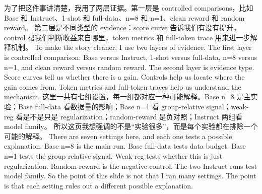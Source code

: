 {}\markdownRendererHorizontalRule{}\markdownRendererInterblockSeparator
{}\markdownRendererInterblockSeparator
{}\markdownRendererInterblockSeparator
{}为了把这件事讲清楚，我用了两层证据。第一层是 controlled comparisons，比如 Base 和 Instruct、1-shot 和 full-data、n=8 和 n=1、clean reward 和 random reward。\markdownRendererInterblockSeparator
{}第二层是不同类型的 evidence：score curve 告诉我们有没有提升，control 帮我们判断收益来自哪里，token metrics 和 full-token trace 用来进一步解释机制。\markdownRendererInterblockSeparator
{}\markdownRendererInterblockSeparator
{}To make the story cleaner, I use two layers of evidence. The first layer is controlled comparison: Base versus Instruct, 1-shot versus full-data, n=8 versus n=1, and clean reward versus random reward.\markdownRendererInterblockSeparator
{}The second layer is evidence type. Score curves tell us whether there is a gain. Controls help us locate where the gain comes from. Token metrics and full-token traces help us understand the mechanism.\markdownRendererInterblockSeparator
{}\markdownRendererHorizontalRule{}\markdownRendererInterblockSeparator
{}\markdownRendererInterblockSeparator
{}\markdownRendererInterblockSeparator
{}这里一共有七组设置，每一组都对应一种可能解释。Base n=8 是主实验；Base full-data 看数据量的影响；Base n=1 看 group-relative signal；weak-reg 看是不是只是 regularization；random-reward 是负对照；Instruct 两组看 model family。\markdownRendererInterblockSeparator
{}所以这页我想强调的不是“实验很多”，而是每个实验都在排除一个可能的解释。\markdownRendererInterblockSeparator
{}\markdownRendererInterblockSeparator
{}There are seven settings here, and each one tests a possible explanation. Base n=8 is the main run. Base full-data tests data budget. Base n=1 tests the group-relative signal. Weak-reg tests whether this is just regularization. Random-reward is the negative control. The two Instruct runs test model family.\markdownRendererInterblockSeparator
{}So the point of this slide is not that I ran many settings. The point is that each setting rules out a different possible explanation.\markdownRendererInterblockSeparator
{}\markdownRendererHorizontalRule{}\markdownRendererInterblockSeparator
{}\markdownRendererInterblockSeparator
{}\markdownRendererInterblockSeparator
